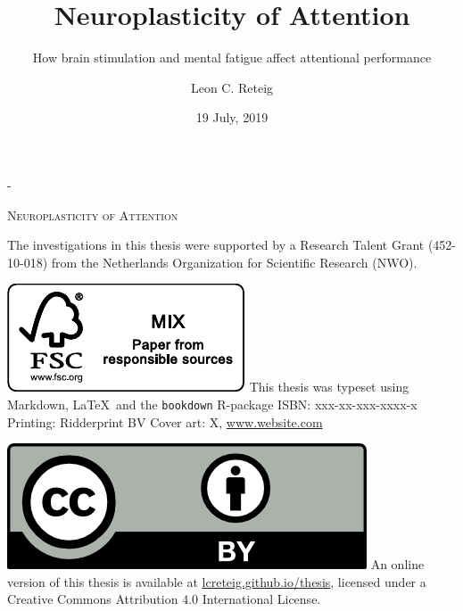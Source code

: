 \documentclass[11pt,]{memoir}
\title{Neuroplasticity of Attention}
\subtitle{How brain stimulation and mental fatigue affect attentional performance}
\author{Leon C. Reteig}
\date{19 July, 2019}
\begin{document}
\maketitle

\setlength{\abstitleskip}{-\absparindent}

\frontmatter
\pagestyle{empty} 

\def\drop{.1\textheight}
\newlength{\mylength}

\vspace*{\drop}
\calccentering{\mylength}
\begin{adjustwidth*}{\mylength}{-\mylength} %
\begin{center}
\Huge \textsc{Neuroplasticity of Attention} %
\end{center}
\end{adjustwidth*}

\clearpage
\vspace*{\fill}
\begingroup %
\small
\setlength{\parskip}{\baselineskip} %
\setlength\parindent{0pt} %
The investigations in this thesis were supported by 
a Research Talent Grant (452-10-018)  %
from 
the Netherlands Organization for Scientific Research (NWO). %

\includegraphics{_bookdown_files/FSC.pdf} \newline
This thesis was typeset using Markdown, \LaTeX\ and the \verb+bookdown+ R-package \newline
ISBN: xxx-xx-xxx-xxxx-x \newline %
Printing: Ridderprint BV \newline %
Cover art: X, \url{www.website.com} %

\includegraphics{_bookdown_files/CC-BY.png} \newline
An online version of this thesis is available at 
\url{lcreteig.github.io/thesis},  %
licensed under a 
Creative Commons Attribution 4.0 International License. %
\endgroup
\end{document}
